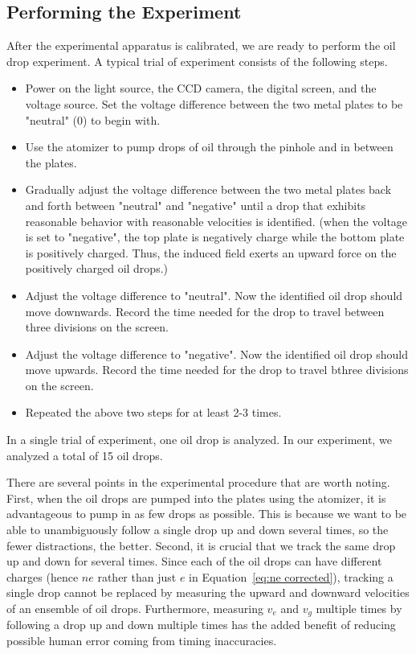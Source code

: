 \documentclass{article}
\begin{document}
\subsection{Performing the Experiment}
\label{sec:perform}
After the experimental apparatus is calibrated, we are ready to perform the oil drop experiment. A typical trial of experiment consists of the following steps.
\begin{itemize}
    \item Power on the light source, the CCD camera, the digital screen, and the voltage source. Set the voltage difference between the two metal plates to be "neutral" (0) to begin with.
    \item Use the atomizer to pump drops of oil through the pinhole and in between the plates.
    \item Gradually adjust the voltage difference between the two metal plates back and forth between "neutral" and "negative" until a drop that exhibits reasonable behavior with reasonable velocities is identified. (when the voltage is set to "negative", the top plate is negatively charge while the bottom plate is positively charged. Thus, the induced field exerts an upward force on the positively charged oil drops.)
    \item Adjust the voltage difference to "neutral". Now the identified oil drop should move downwards. Record the time needed for the drop to travel between three divisions on the screen.
    \item Adjust the voltage difference to "negative". Now the identified oil drop should move upwards. Record the time needed for the drop to travel bthree divisions on the screen.
    \item Repeated the above two steps for at least 2-3 times.
\end{itemize}

In a single trial of experiment, one oil drop is analyzed. In our experiment, we analyzed a total of 15 oil drops.

There are several points in the experimental procedure that are worth noting. First, when the oil drops are pumped into the plates using the atomizer, it is advantageous to pump in as few drops as possible. This is because we want to be able to unambiguously follow a single drop up and down several times, so the fewer distractions, the better. Second, it is crucial that we track the same drop up and down for several times. Since each of the oil drops can have different charges (hence $n e$ rather than just $e$ in Equation~\ref{eq:ne corrected}), tracking a single drop cannot be replaced by measuring the upward and downward velocities of an ensemble of oil drops. Furthermore, measuring $v_e$ and $v_g$ multiple times by following a drop up and down multiple times has the added benefit of reducing possible human error coming from timing inaccuracies. 
\end{document}
